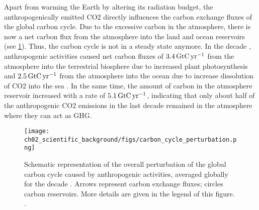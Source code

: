 Apart from warming the Earth by altering its radiation budget, the
anthropogenically emitted \ac{CO2} directly influences the carbon exchange
fluxes of the global carbon cycle. Due to the excessive carbon in the
atmosphere, there is now a net carbon flux from the atmosphere into the land
and ocean reservoirs (see \cref{fig:02:carbon_cycle_perturbation}). Thus, the
carbon cycle is not in a steady state anymore. In the decade
, anthropogenic activities caused net carbon fluxes of $3.4
\unit{\GtCyr{}}$ from the atmosphere into the terrestrial biosphere due to
increased plant photosynthesis and $2.5 \unit{\GtCyr{}}$ from the atmosphere
into the ocean due to increase dissolution of \ac{CO2} into the sea
\autocite{Friedlingstein2020}. In the same time, the amount of carbon in the
atmosphere reservoir increased with a rate of $5.1 \unit{\GtCyr{}}$, indicating
that only about half of the anthropogenic \ac{CO2} emissions in the last decade
remained in the atmosphere \autocite{Friedlingstein2020} where they can act as
\ac{GHG}.

\begin{figure}[t]
  \centering
  \texttt{[image: 
    ch02\_scientific\_background/figs/carbon\_cycle\_perturbation.png]}
  \caption{Schematic representation of the overall perturbation of the global
    carbon cycle caused by anthropogenic activities, averaged globally for the
    decade . Arrows represent carbon exchange fluxes; circles
    carbon reservoirs. More details are given in the legend of this figure.
    .}
  \label{fig:02:carbon_cycle_perturbation}
\end{figure}

